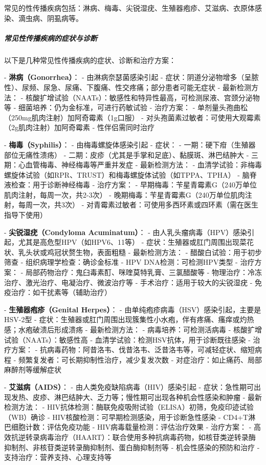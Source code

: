 \begin{enumerate}
常见的性传播疾病包括：淋病、梅毒、尖锐湿疣、生殖器疱疹、艾滋病、衣原体感染、滴虫病、阴虱病等。

\subparagraph{常见性传播疾病的症状与诊断}

以下是几种常见性传播疾病的症状、诊断和治疗方案：

- \textbf{淋病（Gonorrhea）}：
  - 由淋病奈瑟菌感染引起
  - 症状：阴道分泌物增多（呈脓性）、尿频、尿急、尿痛、下腹痛、性交疼痛；部分患者可能无症状
  - 最新检测方法：
    - 核酸扩增试验（NAATs）：敏感性和特异性最高，可检测尿液、宫颈分泌物等
    - 细菌培养：仍为金标准，可进行药敏试验
  - 治疗方案：
    - 单剂量头孢曲松（250mg肌肉注射）加阿奇霉素（1g口服）
    - 对头孢菌素过敏者：可使用大观霉素（2g肌肉注射）加阿奇霉素
    - 性伴侣需同时治疗

- \textbf{梅毒（Syphilis）}：
  - 由梅毒螺旋体感染引起
  - 症状：
    - 一期：硬下疳（生殖器部位无痛性溃疡）
    - 二期：皮疹（尤其是手掌和足底）、黏膜斑、淋巴结肿大
    - 三期：心血管梅毒、神经梅毒等严重并发症
  - 最新检测方法：
    - 血清学试验：非梅毒螺旋体试验（如RPR、TRUST）和梅毒螺旋体试验（如TPPA、TPHA）
    - 脑脊液检查：用于诊断神经梅毒
  - 治疗方案：
    - 早期梅毒：苄星青霉素G（240万单位肌肉注射，每周一次，共2-3次）
    - 晚期梅毒：苄星青霉素G（240万单位肌肉注射，每周一次，共3次）
    - 对青霉素过敏者：可使用多西环素或四环素（需在医生指导下使用）

- \textbf{尖锐湿疣（Condyloma Acuminatum）}：
  - 由人乳头瘤病毒（HPV）感染引起，尤其是高危型HPV（如HPV6、11等）
  - 症状：生殖器或肛门周围出现菜花状、乳头状或鸡冠状赘生物，表面粗糙
  - 最新检测方法：
    - 醋酸白试验：用于初步筛查
    - 组织病理学检查：确诊金标准
    - HPV DNA检测：可检测HPV类型
  - 治疗方案：
    - 局部药物治疗：鬼臼毒素酊、咪喹莫特乳膏、三氯醋酸等
    - 物理治疗：冷冻治疗、激光治疗、电凝治疗、微波治疗等
    - 手术治疗：适用于较大的尖锐湿疣
    - 免疫治疗：如干扰素等（辅助治疗）

- \textbf{生殖器疱疹（Genital Herpes）}：
  - 由单纯疱疹病毒（HSV）感染引起，主要是HSV-2型
  - 症状：生殖器或肛门周围出现簇集性小水疱，伴有疼痛、瘙痒或灼热感；水疱破溃后形成溃疡
  - 最新检测方法：
    - 病毒培养：可检测活病毒
    - 核酸扩增试验（NAATs）：敏感性高
    - 血清学试验：检测HSV抗体，用于诊断既往感染
  - 治疗方案：
    - 抗病毒药物：阿昔洛韦、伐昔洛韦、泛昔洛韦等，可减轻症状、缩短病程
    - 频繁复发者：可长期抑制性治疗，减少复发次数
    - 对症治疗：如止痛药、局部麻醉剂等缓解症状

- \textbf{艾滋病（AIDS）}：
  - 由人类免疫缺陷病毒（HIV）感染引起
  - 症状：急性期可出现发热、皮疹、淋巴结肿大、乏力等；慢性期可出现各种机会性感染和肿瘤
  - 最新检测方法：
    - HIV抗体检测：酶联免疫吸附试验（ELISA）初筛，免疫印迹试验（WB）确诊
    - HIV核酸检测：可早期检测感染，用于诊断急性感染
    - CD4+T淋巴细胞计数：评估免疫功能
    - HIV病毒载量检测：评估治疗效果
  - 治疗方案：
    - 高效抗逆转录病毒治疗（HAART）：联合使用多种抗病毒药物，如核苷类逆转录酶抑制剂、非核苷类逆转录酶抑制剂、蛋白酶抑制剂等
    - 机会性感染的预防和治疗
    - 支持治疗：营养支持、心理支持等


\end{enumerate}
